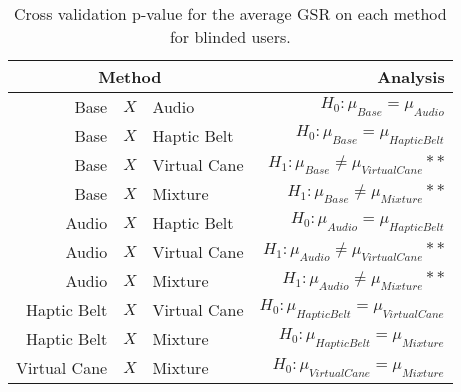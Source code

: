 
\begin{table}[!htb]
\centering
\caption{Cross validation p-value for the average GSR on each method for blinded users.}
\label{tab:lsd_gsr}
\begin{tabular}{rclr}
\toprule
      \multicolumn{3}{c}{Method} &                                       Analysis \\
\midrule
              Base & $X$ & Audio &               $H_0 : \mu_{Base} = \mu_{Audio}$ \\
        Base & $X$ & Haptic Belt &         $H_0 : \mu_{Base} = \mu_{Haptic Belt}$ \\
       Base & $X$ & Virtual Cane &    $H_1 : \mu_{Base} \ne \mu_{Virtual Cane}**$ \\
            Base & $X$ & Mixture &         $H_1 : \mu_{Base} \ne \mu_{Mixture}**$ \\
       Audio & $X$ & Haptic Belt &        $H_0 : \mu_{Audio} = \mu_{Haptic Belt}$ \\
      Audio & $X$ & Virtual Cane &   $H_1 : \mu_{Audio} \ne \mu_{Virtual Cane}**$ \\
           Audio & $X$ & Mixture &        $H_1 : \mu_{Audio} \ne \mu_{Mixture}**$ \\
Haptic Belt & $X$ & Virtual Cane & $H_0 : \mu_{Haptic Belt} = \mu_{Virtual Cane}$ \\
     Haptic Belt & $X$ & Mixture &      $H_0 : \mu_{Haptic Belt} = \mu_{Mixture}$ \\
    Virtual Cane & $X$ & Mixture &     $H_0 : \mu_{Virtual Cane} = \mu_{Mixture}$ \\
\bottomrule
\end{tabular}
\end{table}

